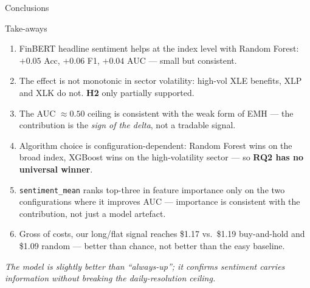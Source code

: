 \documentclass[aspectratio=169,11pt]{beamer}
\begin{document}
\begin{frame}{Conclusions}
\scriptsize
\begin{block}{Take-aways}
\begin{enumerate}\setlength\itemsep{1pt}\setlength\parskip{0pt}
  \item FinBERT headline sentiment \alert{helps at the index level} with Random Forest: $+0.05$ Acc, $+0.06$ F1, $+0.04$ AUC --- small but consistent.
  \item The effect is \alert{not monotonic in sector volatility}: high-vol XLE benefits, XLP and XLK do not. \textbf{H2} only partially supported.
  \item The AUC $\approx 0.50$ ceiling is \alert{consistent with the weak form of EMH} --- the contribution is the \textit{sign of the delta}, not a tradable signal.
  \item Algorithm choice is \alert{configuration-dependent}: Random Forest wins on the broad index, XGBoost wins on the high-volatility sector --- so \textbf{RQ2 has no universal winner}.
  \item \texttt{sentiment\_mean} ranks \alert{top-three in feature importance} only on the two configurations where it improves AUC --- importance is consistent with the contribution, not just a model artefact.
  \item Gross of costs, our long/flat signal reaches \$1.17 vs.\ \$1.19 buy-and-hold and \$1.09 random --- \alert{better than chance, not better than the easy baseline}.
\end{enumerate}
\end{block}

\vspace{2pt}
\begin{center}\scriptsize\itshape\color{TecGray}
The model is \emph{slightly} better than ``always-up''; it confirms sentiment carries information without breaking the daily-resolution ceiling.
\end{center}
\end{frame}
\end{document}

